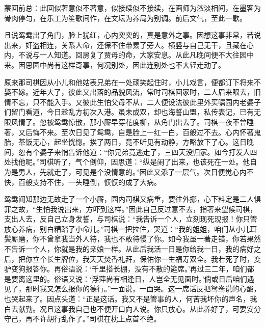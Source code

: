\begin{parag}
    \begin{note}蒙回前总：此回似著意似不著意，似接续似不接续，在画师为浓淡相间，在墨客为骨肉停匀，在乐工为笙歌间作，在文坛为养局为别调。前后文气，至此一歇。\end{note}
\end{parag}


\begin{parag}
    且说鸳鸯出了角门，脸上犹红，心内突突的，真是意外之事。因想这事非常，若说出来，奸盗相连，关系人命，还保不住带累了旁人。横竖与自己无干，且藏在心内，不说与一人知道。回房复了贾母的命，大家安息。从此凡晚间便不大往园中来。因思园中尚有这样奇事，何况别处，因此连别处也不大轻走动了。
\end{parag}


\begin{parag}
    原来那司棋因从小儿和他姑表兄弟在一处顽笑起住时，小儿戏言，便都订下将来不娶不嫁。近年大了，彼此又出落的品貌风流，常时司棋回家时，二人眉来眼去，旧情不忘，只不能入手。又彼此生怕父母不从，二人便设法彼此里外买嘱园内老婆子们留门看道，今日趁乱方初次入港。虽未成双，却也海誓山盟，私传表记，已有无限风情了。忽被鸳鸯惊散，那小厮早穿花度柳，从角门出去了。司棋一夜不曾睡著，又后悔不来。至次日见了鸳鸯，自是脸上一红一白，百般过不去。心内怀著鬼胎，茶饭无心，起坐恍惚。挨了两日，竟不听见有动静，方略放下了心。这日晚间，忽有个婆子来悄告诉他道：“你兄弟竟逃走了，三四天没归家。如今打发人四处找他呢。”司棋听了，气个倒仰，因思道：“纵是闹了出来，也该死在一处。他自为是男人，先就走了，可见是个没情意的。”因此又添了一层气。次日便觉心内不快，百般支持不住，一头睡倒，恹恹的成了大病。
\end{parag}


\begin{parag}
    鸳鸯闻知那边无故走了一个小厮，园内司棋又病重，要往外挪，心下料定是二人惧罪之故，“生怕我说出来，方吓到这样。”因此自己反过意不去，指著来望候司棋，支出人去，反自己立身发誓，与司棋说：“我告诉一个人，立刻现死现报！你只管放心养病，别白糟踏了小命儿。”司棋一把拉住，哭道：“我的姐姐，咱们从小儿耳鬓厮磨，你不曾拿我当外人待，我也不敢待慢了你。如今我虽一著走错，你若果然不告诉一个人，你就是我的亲娘一样。从此后我活一日是你给我一日，我的病好之后，把你立个长生牌位，我天天焚香礼拜，保佑你一生福寿双全。我若死了时，变驴变狗报答你。再俗语说：‘千里搭长棚，没有不散的筵席。’再过三二年，咱们都是要离这里的。俗语又说：‘浮萍尚有相逢日，人岂全无见面时。’倘或日后咱们遇见了，那时我又怎么报你的德行。”一面说，一面哭。这一席话反把鸳鸯说的心酸，也哭起来了。因点头道：“正是这话。我又不是管事的人，何苦我坏你的声名，我白去献勤。况且这事我自己也不便开口向人说。你只放心。从此养好了，可要安分守己，再不许胡行乱作了。”司棋在枕上点首不绝。
\end{parag}


